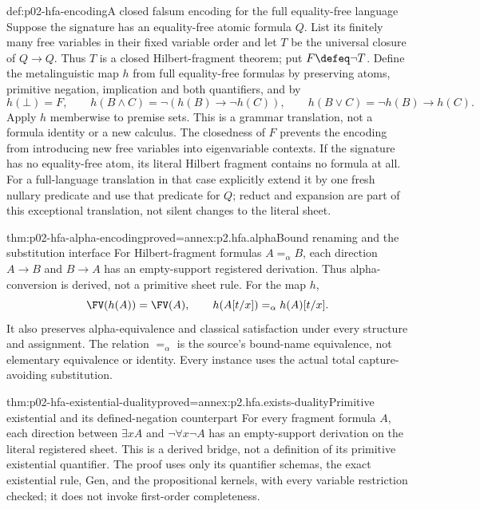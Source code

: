 \begin{hbdefinition}{def:p02-hfa-encoding}{A closed falsum encoding for the full equality-free language}
Suppose the signature has an equality-free atomic formula \(Q\).
List its finitely many free variables in their fixed variable order and
let \(T\) be the universal closure of \(Q\to Q\). Thus \(T\) is a
closed Hilbert-fragment theorem; put \(F\defeq\neg T\).
Define the metalinguistic map \(h\) from full equality-free formulas
by preserving atoms, primitive negation, implication and both quantifiers,
and by
\[
 h(\bot)=F,\qquad
 h(B\land C)=\neg(h(B)\to\neg h(C)),\qquad
 h(B\lor C)=\neg h(B)\to h(C).
\]
Apply \(h\) memberwise to premise sets. This is a grammar translation,
not a formula identity or a new calculus. The closedness of \(F\)
prevents the encoding from introducing new free variables into
eigenvariable contexts. If the signature has no equality-free atom,
its literal Hilbert fragment contains no formula at all. For a
full-language translation in that case explicitly extend it by one
fresh nullary predicate and use that predicate for \(Q\); reduct and
expansion are part of this exceptional translation, not silent changes
to the literal sheet.
\end{hbdefinition}

\begin{hblemma}{thm:p02-hfa-alpha-encoding}{proved=annex:p2.hfa.alpha}{Bound renaming and the substitution interface}
For Hilbert-fragment formulas \(A=_{\alpha}B\), each direction
\(A\to B\) and \(B\to A\) has an empty-support registered derivation.
Thus alpha-conversion is derived, not a primitive sheet rule.
For the map \(h\),
\[
 \FV(h(A))=\FV(A),\qquad
 h(A[t/x])=_{\alpha}h(A)[t/x].
\]
It also preserves alpha-equivalence and classical satisfaction under
every structure and assignment. The relation \(=_{\alpha}\) is the
source's bound-name equivalence, not elementary equivalence or identity.
Every instance uses the actual total capture-avoiding substitution.
\end{hblemma}

\begin{hblemma}{thm:p02-hfa-existential-duality}{proved=annex:p2.hfa.exists-duality}{Primitive existential and its defined-negation counterpart}
For every fragment formula \(A\), each direction between
\(\exists xA\) and \(\neg\forall x\neg A\) has an empty-support
derivation on the literal registered sheet. This is a derived bridge,
not a definition of its primitive existential quantifier. The proof
uses only its quantifier schemas, the exact existential rule, Gen,
and the propositional kernels, with every variable restriction checked;
it does not invoke first-order completeness.
\end{hblemma}

